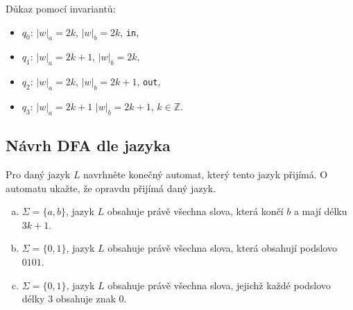 \begin{multicols}{2}


    Důkaz pomocí invariantů:
    \begin{itemize}[noitemsep]
        \item $q_0$: $|w|_a = 2k$, $|w|_b = 2k$, \texttt{in},
        \item $q_1$: $|w|_a = 2k + 1$, $|w|_b = 2k$,
        \item $q_2$: $|w|_a = 2k$, $|w|_b = 2k + 1$, \texttt{out},
        \item $q_3$: $|w|_a = 2k + 1$ $|w|_b = 2k+ 1$, $k \in \mathbb{Z}$.
    \end{itemize}
\end{multicols}

\subsection{Návrh DFA dle jazyka}
Pro daný jazyk $L$ navrhněte konečný automat, který tento jazyk přijímá. O automatu ukažte, že opravdu přijímá daný jazyk.

\begin{enumerate}[a), noitemsep]
    \item $\Sigma = \{a,b\}$, jazyk $L$ obsahuje právě všechna slova, která končí $b$ a mají délku $3k+1$.
    \item $\Sigma = \{0,1\}$, jazyk $L$ obsahuje právě všechna slova, která obsahují podslovo $0101$.
    \item $\Sigma = \{0,1\}$, jazyk $L$ obsahuje právě všechna slova, jejichž každé podslovo délky $3$ obsahuje znak $0$.
\end{enumerate}

